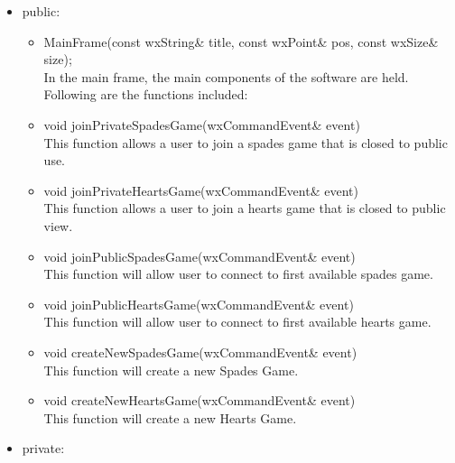\documentclass[]{scrartcl}
\begin{document}
 	\begin{itemize}
 		\item public:

 		\begin{itemize}
 			\item MainFrame(const wxString\& title, const wxPoint\& pos, const wxSize\& size);
 				\\ In the main frame, the main components of the software are held. Following are the functions included:

 			\item void joinPrivateSpadesGame(wxCommandEvent\& event) {}
 				\\This function allows a user to join a spades game that is closed to public use.

 			\item void joinPrivateHeartsGame(wxCommandEvent\& event) {}
 				\\ This function allows a user to join a hearts game that is closed to public view.

 			\item void joinPublicSpadesGame(wxCommandEvent\& event) {}
 				\\ This function will allow user to connect to first available spades game.

 			\item void joinPublicHeartsGame(wxCommandEvent\& event) {}
 				\\ This function will allow user to connect to first available hearts game.

 			\item void createNewSpadesGame(wxCommandEvent\& event) {}
 				\\	This function will create a new Spades Game.

 			\item void createNewHeartsGame(wxCommandEvent\& event) {}
 				\\ This function will create a new Hearts Game.

 		\end{itemize}

 		\item 	private:


\end{itemize}
\end{document}

